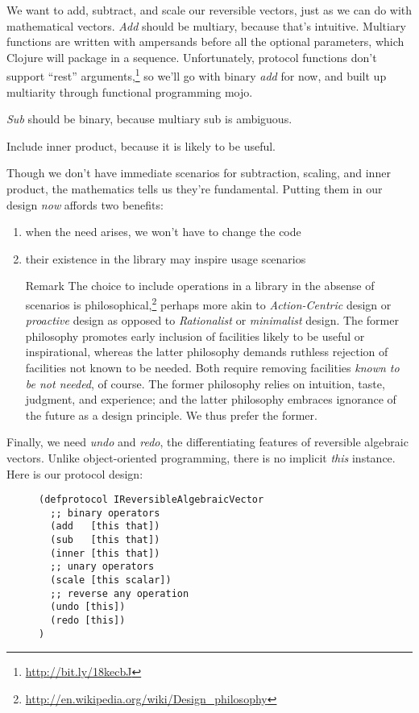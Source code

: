 \documentclass[11pt]{article}
\begin{document}
We want to add, subtract, and scale our reversible vectors, just as we
can do with mathematical vectors.  \emph{Add} should be multiary, because
that's intuitive.  Multiary functions are written with ampersands
before all the optional parameters, which Clojure will package in a
sequence. Unfortunately, protocol functions don't support ``rest''
arguments,\footnote{\url{http://bit.ly/18kecbJ}} so we'll go with binary \emph{add}
for now, and built up multiarity through functional programming mojo.

\emph{Sub} should be binary, because multiary sub is ambiguous.

Include inner product, because it is likely to be useful.

Though we don't have immediate scenarios for subtraction, scaling, and
inner product, the mathematics tells us they're fundamental. Putting
them in our design \emph{now} affords two benefits:
\begin{enumerate}
\item when the need arises, we won't have to change the code
\item their existence in the library may inspire usage scenarios

\item[{Remark}] The choice to include operations in a library in the absense
of scenarios is
philosophical,\footnote{\url{http://en.wikipedia.org/wiki/Design_philosophy}}
perhaps more akin to \emph{Action-Centric} design or \emph{proactive}
design as opposed to \emph{Rationalist} or \emph{minimalist}
design. The former philosophy promotes early inclusion of
facilities likely to be useful or inspirational, whereas the
latter philosophy demands ruthless rejection of facilities
not known to be needed. Both require removing facilities
\emph{known to be not needed}, of course. The former philosophy
relies on intuition, taste, judgment, and experience; and
the latter philosophy embraces ignorance of the future as a
design principle. We thus prefer the former.
\end{enumerate}

Finally, we need \emph{undo} and \emph{redo}, the differentiating features of
reversible algebraic vectors. Unlike object-oriented programming,
there is no implicit \emph{this} instance.  Here is our protocol design:

\begin{figure}[H]
\label{reversible-algebraic-vector-protocol}
\begin{verbatim}
(defprotocol IReversibleAlgebraicVector
  ;; binary operators
  (add   [this that])
  (sub   [this that])
  (inner [this that])
  ;; unary operators
  (scale [this scalar])
  ;; reverse any operation
  (undo [this])
  (redo [this])
)
\end{verbatim}
\end{figure}
\end{document}
